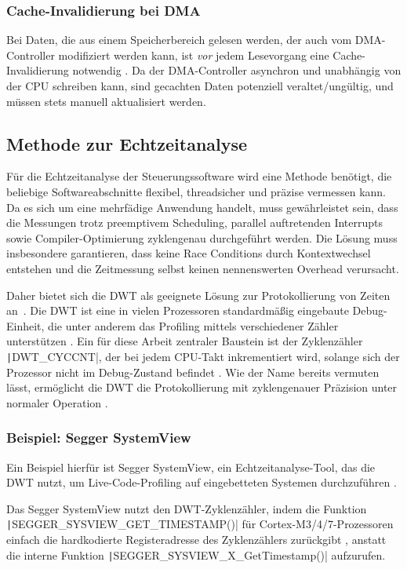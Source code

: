 \subsubsection{Cache-Invalidierung bei DMA}

Bei Daten, die aus einem Speicherbereich gelesen werden, der auch vom
DMA-Controller modifiziert werden kann, ist \textit{vor} jedem Lesevorgang eine
Cache-Invalidierung notwendig \cite{embeddedexpert_cache}. Da der DMA-Controller
asynchron und unabhängig von der CPU schreiben kann, sind gecachten Daten
potenziell veraltet/ungültig, und müssen stets manuell aktualisiert werden.

\subsection{Methode zur Echtzeitanalyse} \label{sec:dwt}

Für die Echtzeitanalyse der Steuerungssoftware wird eine Methode benötigt, die
beliebige Softwareabschnitte flexibel, threadsicher und präzise vermessen kann.
Da es sich um eine mehrfädige Anwendung handelt, muss gewährleistet sein, dass
die Messungen trotz preemptivem Scheduling, parallel auftretenden Interrupts
sowie Compiler-Optimierung zyklengenau durchgeführt werden. Die Lösung muss
insbesondere garantieren, dass keine Race Conditions durch Kontextwechsel
entstehen und die Zeitmessung selbst keinen nennenswerten Overhead verursacht.

Daher bietet sich die \ac{DWT} als geeignete Lösung zur Protokollierung von
Zeiten an~\cite{ARM_KA001499}. Die DWT ist eine in vielen Prozessoren
standardmäßig eingebaute Debug-Einheit, die unter anderem das Profiling mittels
verschiedener Zähler unterstützen \cite{ARMv7_ref_man_dwt_profiling}. Ein für
diese Arbeit zentraler Baustein ist der Zyklenzähler \texttt|DWT_CYCCNT|,
der bei jedem CPU-Takt inkrementiert wird, solange sich der Prozessor nicht im
Debug-Zustand befindet \cite{ARMv7_ref_man_dwt_cycle}. Wie der Name bereits
vermuten lässt, ermöglicht die DWT die Protokollierung mit zyklengenauer
Präzision unter normaler Operation \cite{ARMv7_ref_man_dwt_profiling}.

\subsubsection{Beispiel: Segger SystemView}

Ein Beispiel hierfür ist Segger SystemView, ein Echtzeitanalyse-Tool, das die
DWT nutzt, um Live-Code-Profiling auf eingebetteten Systemen durchzuführen
\cite{SEGGER_SystemView}.

Das Segger SystemView nutzt den DWT-Zyklenzähler, indem die Funktion \linebreak
\texttt|SEGGER_SYSVIEW_GET_TIMESTAMP()| für Cortex-M3/4/7-Prozessoren
einfach die hardkodierte Registeradresse des Zyklenzählers zurückgibt \cite[S.
65]{Segger_SystemView_manual}\cite{Arm_DWT_Programmers_Model}, anstatt die
interne Funktion \texttt|SEGGER_SYSVIEW_X_GetTimestamp()| aufzurufen.
